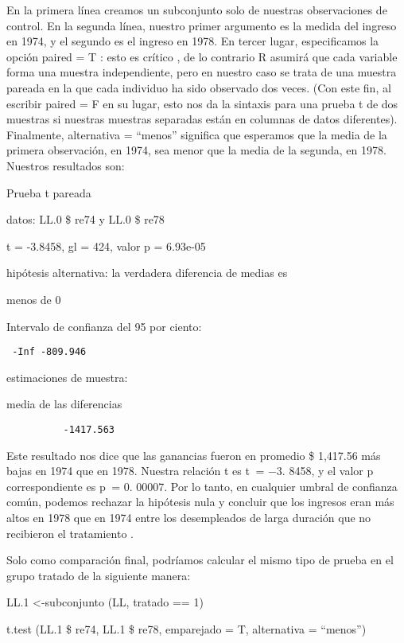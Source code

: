 \documentclass[
]{book}
\begin{document}
En la primera línea creamos un subconjunto solo de nuestras observaciones de control. En la segunda línea, nuestro primer argumento es la medida del ingreso en 1974, y el segundo es el ingreso en 1978. En tercer lugar, especificamos la opción paired = T : esto es crítico , de lo contrario R asumirá que cada variable forma una muestra independiente, pero en nuestro caso se trata de una muestra pareada en la que cada individuo ha sido observado dos veces. (Con este fin, al escribir paired = F en su lugar, esto nos da la sintaxis para una prueba t de dos muestras si nuestras muestras separadas están en columnas de datos diferentes). Finalmente, alternativa = ``menos'' significa que esperamos que la media de la primera observación, en 1974, sea menor que la media de la segunda, en 1978. Nuestros resultados son:

Prueba t pareada

datos: LL.0 \$ re74 y LL.0 \$ re78

t = -3.8458, gl = 424, valor p = 6.93e-05

hipótesis alternativa: la verdadera diferencia de medias es

menos de 0

Intervalo de confianza del 95 por ciento:

\begin{verbatim}
 -Inf -809.946
\end{verbatim}

estimaciones de muestra:

media de las diferencias

\begin{verbatim}
          -1417.563
\end{verbatim}

Este resultado nos dice que las ganancias fueron en promedio \$ 1,417.56 más bajas en 1974 que en 1978. Nuestra relación t es t  = −3. 8458, y el valor p correspondiente es p  = 0. 00007. Por lo tanto, en cualquier umbral de confianza común, podemos rechazar la hipótesis nula y concluir que los ingresos eran más altos en 1978 que en 1974 entre los desempleados de larga duración que no recibieron el tratamiento .

Solo como comparación final, podríamos calcular el mismo tipo de prueba en el grupo tratado de la siguiente manera:

LL.1 \textless-subconjunto (LL, tratado == 1)

t.test (LL.1 \$ re74, LL.1 \$ re78, emparejado = T, alternativa = ``menos'')
\end{document}
